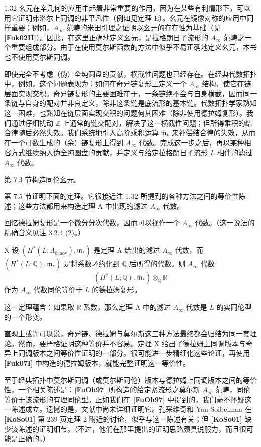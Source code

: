 \begin{remark}{1.32}
幺元在辛几何的应用中起着非常重要的作用，因为在某些有利情形下，可以用它证明弗洛尔上同调的非平凡性（例如见定理 E）。幺元在镜像对称的应用中同样重要；例如，$A_\infty$ 范畴的米田引理之证明以幺元的存在性为基础（见 \textbf{[Fuk02II]}）。因此，在这里正确地定义幺元，是拉格朗日子流形的 $A_\infty$ 范畴之一个重要组成部分。由于在使用莫尔斯函数的方法中似乎不易正确地定义幺元，本书也不使用莫尔斯同调。

即使完全不考虑（伪）全纯圆盘的贡献，横截性问题也已经存在。在经典代数拓扑中，例如，这个问题表现为：如何在奇异链复形上定义一个 $A_\infty$ 结构，使它在链层面实现交积。奇异链复形的主要困难在于，一条链绝不会与自身横截，因而同一条链与自身的配对并非良定义，除非这条链是底流形的基本链。代数拓扑学家熟知这一困难，也熟知在链层面实现交积的问题何其困难（除非使用德拉姆复形）。我们通过仔细扰动 $\mathbb Z$ 上通常的链交配对，解决了这一横截性问题；但所得乘积的结合律随后必然失效。我们系统地引入高阶乘积运算 $\overline{\mathfrak m}_k$ 来补偿结合律的失效，从而在一个可数生成的（余）链复形上得到 $A_\infty$ 代数。完成这一步之后，再以某种相容方式继续纳入伪全纯圆盘的贡献，并定义与给定拉格朗日子流形 $L$ 相伴的滤过 $A_\infty$ 代数。
\end{remark}

第 7.3 节构造同伦幺元。

第 7.5 节证明下面的定理。它很接近注 1.32 所提到的各种方法之间的等价性陈述；这些方法都用来构造定理 A 中出现的滤过 $A_\infty$ 代数。

回忆德拉姆复形是一个微分分次代数，因而可以视作一个 $A_\infty$ 代数。（这一说法的精确含义见注 3.2.4 (2)。）

\begin{theorem}{X}\label{thm:intro-X}
设 $(H^*(L;\Lambda_{0,\mathrm{nov}}),\mathfrak m_*)$ 是定理 A 给出的滤过 $A_\infty$ 代数，而 $(H^*(L;\mathbb Q),\overline{\mathfrak m}_*)$ 是将系数环约化到 $\mathbb Q$ 后所得的代数。则 $A_\infty$ 代数
\[
  (H^*(L;\mathbb Q),\overline{\mathfrak m}_*)
  \otimes_{\mathbb Q}\mathbb R
\]
作为 $A_\infty$ 代数同伦等价于 $L$ 的德拉姆复形。
\end{theorem}

这一定理蕴含：如果取 $\mathbb R$ 系数，那么定理 A 中的滤过 $A_\infty$ 代数是 $L$ 的实同伦型的一个形变。

直观上或许可以说，奇异链、德拉姆与莫尔斯这三种方法最终都会归结为同一套理论。然而，要严格证明这种等价并不容易。定理 X 给出了德拉姆上同调版本与奇异上同调版本之间等价性证明的一部分。很可能进一步精细化这些论证，再使用 \textbf{[Fuk07I]} 中构造的德拉姆版本，就能完整证明这一等价性。

至于经典拓扑中莫尔斯同调（或莫尔斯同伦）版本与德拉姆上同调版本之间的等价性，一个相关陈述是：\textbf{[FuOh97]} 所构造的给定紧流形之莫尔斯 $A_\infty$ 范畴，同伦等价于该流形的有理同伦型。正如我们在 \textbf{[FuOh97]} 中提到的，我们毫不怀疑这一陈述成立。遗憾的是，文献中尚未详细证明它。孔采维奇和 Yan Soibelman 在 \textbf{[KoSo01]} 第 239 页定理 2 附近的讨论，似乎与这一陈述有关；但 \textbf{[KoSo01]} 缺少该陈述的证明细节。（不过，他们在那里提出的证明思路颇具说服力，而且很可能是正确的。）

